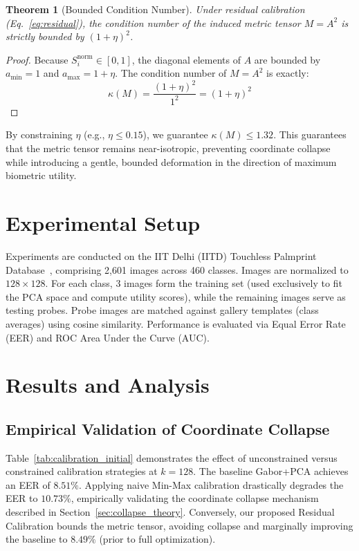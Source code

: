 \documentclass[conference]{IEEEtran}
\newtheorem{theorem}{Theorem}
\begin{document}
\begin{theorem}[Bounded Condition Number]
\label{thm:bounded}
Under residual calibration (Eq.~\ref{eq:residual}), the condition number of the induced metric tensor $M = A^2$ is strictly bounded by $(1+\eta)^2$.
\end{theorem}
\begin{proof}
Because $S_i^{\text{norm}} \in [0, 1]$, the diagonal elements of $A$ are bounded by $a_{\min} = 1$ and $a_{\max} = 1 + \eta$. The condition number of $M = A^2$ is exactly:
\begin{equation}
    \kappa(M) = \frac{(1+\eta)^2}{1^2} = (1+\eta)^2
\end{equation}
\end{proof}

By constraining $\eta$ (e.g., $\eta \leq 0.15$), we guarantee $\kappa(M) \leq 1.32$. This guarantees that the metric tensor remains near-isotropic, preventing coordinate collapse while introducing a gentle, bounded deformation in the direction of maximum biometric utility.

\section{Experimental Setup}
\label{sec:setup}

Experiments are conducted on the IIT Delhi (IITD) Touchless Palmprint Database~\cite{kumar2008incorporating}, comprising 2,601 images across 460 classes. Images are normalized to $128 \times 128$. For each class, 3 images form the training set (used exclusively to fit the PCA space and compute utility scores), while the remaining images serve as testing probes. Probe images are matched against gallery templates (class averages) using cosine similarity. Performance is evaluated via Equal Error Rate (EER) and ROC Area Under the Curve (AUC).

\section{Results and Analysis}
\label{sec:results}

\subsection{Empirical Validation of Coordinate Collapse}
Table~\ref{tab:calibration_initial} demonstrates the effect of unconstrained versus constrained calibration strategies at $k=128$. The baseline Gabor+PCA achieves an EER of $8.51\%$. Applying naive Min-Max calibration drastically degrades the EER to $10.73\%$, empirically validating the coordinate collapse mechanism described in Section~\ref{sec:collapse_theory}. Conversely, our proposed Residual Calibration bounds the metric tensor, avoiding collapse and marginally improving the baseline to $8.49\%$ (prior to full optimization).
\end{document}

